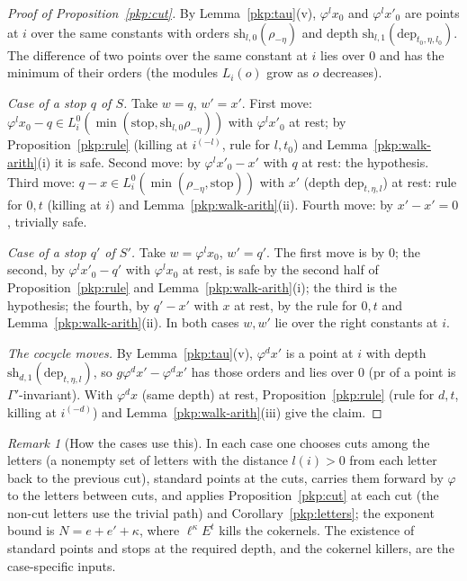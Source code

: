 \documentclass[10pt]{amsart}
\theoremstyle{definition}
\theoremstyle{remark}
\newtheorem{remark}[theorem]{Remark}
\begin{document}
\begin{proof}[Proof of Proposition~\ref{pkp:cut}]
By Lemma~\ref{pkp:tau}(v), $\varphi^lx_0$ and $\varphi^lx'_0$ are points at $i$ over the same
constants with orders $\mathrm{sh}_{l,0}(\rho_{-\eta})$ and depth $\mathrm{sh}_{l,1}(\mathrm{dep}_{t_0,
\eta,l_0})$. The difference of two points over the same constant at $i$ lies over $0$ and has the
minimum of their orders (the modules $L_i(o)$ grow as $o$ decreases).

\emph{Case of a stop $q$ of $S$.} Take $w=q$, $w'=x'$. First move: $\varphi^lx_0-q\in
L^0_i(\min(\mathrm{stop},\mathrm{sh}_{l,0}\rho_{-\eta}))$ with $\varphi^lx'_0$ at rest; by
Proposition~\ref{pkp:rule} (killing at $i^{(-l)}$, rule for $l,t_0$) and Lemma~\ref{pkp:walk-arith}(i) it
is safe. Second move: by $\varphi^lx'_0-x'$ with $q$ at rest: the hypothesis. Third move: $q-x\in
L^0_i(\min(\rho_{-\eta},\mathrm{stop}))$ with $x'$ (depth $\mathrm{dep}_{t,\eta,l}$) at rest: rule for
$0,t$ (killing at $i$) and Lemma~\ref{pkp:walk-arith}(ii). Fourth move: by $x'-x'=0$, trivially safe.

\emph{Case of a stop $q'$ of $S'$.} Take $w=\varphi^lx_0$, $w'=q'$. The first move is by $0$; the
second, by $\varphi^lx'_0-q'$ with $\varphi^lx_0$ at rest, is safe by the second half of
Proposition~\ref{pkp:rule} and Lemma~\ref{pkp:walk-arith}(i); the third is the hypothesis; the fourth,
by $q'-x'$ with $x$ at rest, by the rule for $0,t$ and Lemma~\ref{pkp:walk-arith}(ii). In both cases
$w,w'$ lie over the right constants at $i$.

\emph{The cocycle moves.} By Lemma~\ref{pkp:tau}(v), $\varphi^dx'$ is a point at $i$ with depth
$\mathrm{sh}_{d,1}(\mathrm{dep}_{t,\eta,l})$, so $g\varphi^dx'-\varphi^dx'$ has those orders and lies over
$0$ ($\mathrm{pr}$ of a point is $\Gamma'$-invariant). With $\varphi^dx$ (same depth) at rest,
Proposition~\ref{pkp:rule} (rule for $d,t$, killing at $i^{(-d)}$) and Lemma~\ref{pkp:walk-arith}(iii)
give the claim.
\end{proof}

\begin{remark}[How the cases use this]\label{pkp:rem-use}
In each case one chooses cuts among the letters (a nonempty set of letters with the distance $l(i)>0$
from each letter back to the previous cut), standard points at the cuts, carries them forward by
$\varphi$ to the letters between cuts, and applies Proposition~\ref{pkp:cut} at each cut (the
non-cut letters use the trivial path) and Corollary~\ref{pkp:letters}; the exponent bound is
$N=e+e'+\kappa$, where $\ell^\kappa E^t$ kills the cokernels. The existence of standard points and
stops at the required depth, and the cokernel killers, are the case-specific inputs.
\end{remark}
\end{document}
